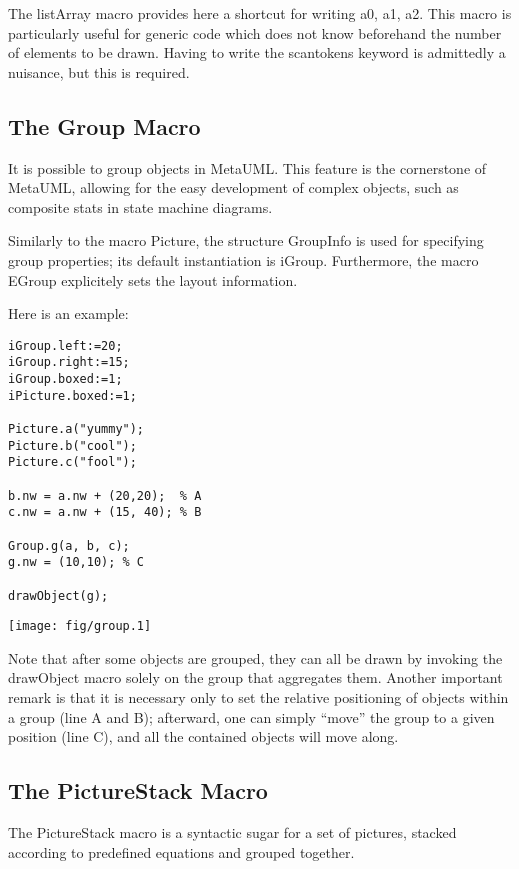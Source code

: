 \documentclass{article}
\newcommand{\code}{\ttfamily}
\begin{document}
The {\code listArray} macro provides here a shortcut for writing
{\code a0, a1, a2}. This macro is particularly useful for generic
code which does not know beforehand the number of elements to be drawn.
Having to write the {\code scantokens} keyword is admittedly a nuisance, but
this is required.


\subsection{The Group Macro}

It is possible to group objects in MetaUML. This feature is the cornerstone
of MetaUML, allowing for the easy development of complex objects, such as
composite stats in state machine diagrams.

Similarly to the macro {\code Picture}, the structure {\code GroupInfo}
is used for specifying group properties; its default instantiation is
{\code iGroup}. Furthermore, the macro {\code EGroup} explicitely sets the
layout information.

Here is an example:

\begin{multicols}{2}
\begin{verbatim}
iGroup.left:=20;
iGroup.right:=15;
iGroup.boxed:=1;
iPicture.boxed:=1;

Picture.a("yummy");
Picture.b("cool");
Picture.c("fool");

b.nw = a.nw + (20,20);  % A
c.nw = a.nw + (15, 40); % B

Group.g(a, b, c);
g.nw = (10,10); % C

drawObject(g);
\end{verbatim}
\columnbreak
\hspace{1cm}\texttt{[image: fig/group.1]}
\end{multicols}

Note that after some objects are grouped, they can all be drawn
by invoking the {\code drawObject} macro solely on the group that aggregates them.
Another important remark is that it is necessary only to set the relative
positioning of objects within a group (line A and B); afterward, one can
simply ``move'' the group to a given position (line C), and all the contained
objects will move along.

\subsection{The PictureStack Macro}

The {\code PictureStack} macro is a syntactic sugar for a set of pictures,
stacked according to predefined equations and grouped together.
\end{document}
